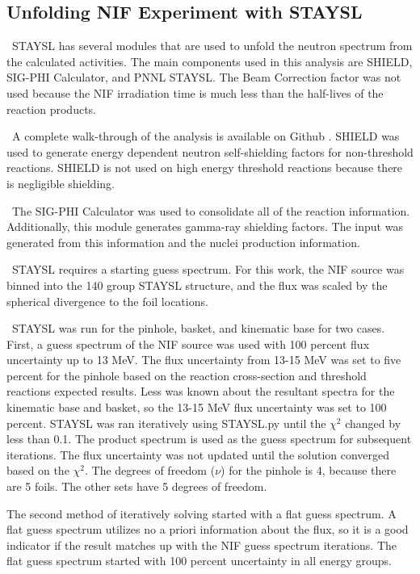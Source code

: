 \documentclass[journal]{IEEEtran}
\begin{document}
{	\subsection{Unfolding NIF Experiment with STAYSL}
	\ STAYSL has several modules that are used to unfold the neutron spectrum from the calculated activities. 
The main components used in this analysis are SHIELD, SIG-PHI Calculator, and PNNL STAYSL. 
The Beam Correction factor was not used because the NIF irradiation time is much less than the half-lives of the reaction products. 
	 
	\ A complete walk-through of the analysis is available on Github \cite{Me}. 
SHIELD was used to generate energy dependent neutron self-shielding factors for non-threshold reactions. 
SHIELD is not used on high energy threshold reactions because there is negligible shielding. 
	
	\ The SIG-PHI Calculator was used to consolidate all of the reaction information. Additionally, this module generates gamma-ray shielding factors. 
The input was generated from this information and the nuclei production information. %
	
	\ STAYSL requires a starting guess spectrum. 
For this work, the NIF source was binned into the 140 group STAYSL structure, and the flux was scaled by the spherical divergence to the foil locations. 
	
	\ STAYSL was run for the pinhole, basket, and kinematic base for two cases. 
First, a guess spectrum  of the NIF source %
was used with 100 percent flux uncertainty up to 13 MeV. %
The flux uncertainty from 13-15 MeV was set to five percent for the pinhole based on the reaction cross-section and threshold reactions expected results. %
Less was known about the resultant spectra for the kinematic base and basket, so the 13-15 MeV flux uncertainty was set to 100 percent. 
STAYSL was ran iteratively using STAYSL.py %
until the $\chi^{2}$ changed by less than 0.1. 
The product spectrum is used as the guess spectrum for subsequent iterations. 
The flux uncertainty was not updated until the solution converged based on the $\chi^{2}$.
The degrees of freedom ($\nu$) for the pinhole is 4, because there are 5 foils. The other sets have 5 degrees of freedom.  %
	
	The second method of iteratively solving started with a flat guess spectrum. 
A flat guess spectrum utilizes no a priori information about the flux, so it is a good indicator if the result matches up with the NIF guess spectrum iterations. 
The flat guess spectrum started with 100 percent uncertainty in all energy groups. 
	
}
\end{document}
